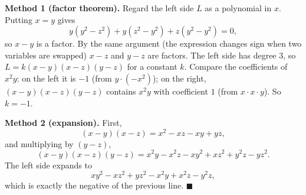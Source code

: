 \textbf{Method 1 (factor theorem).} Regard the left side $L$ as a polynomial in $x$. Putting $x=y$ gives
\[
y(y^2-z^2)+y(z^2-y^2)+z(y^2-y^2)=0 ,
\]
so $x-y$ is a factor. By the same argument (the expression changes sign when two variables are swapped) $x-z$ and $y-z$ are factors. The left side has degree $3$, so $L=k(x-y)(x-z)(y-z)$ for a constant $k$. Compare the coefficients of $x^2y$: on the left it is $-1$ (from $y\cdot(-x^2)$); on the right, $(x-y)(x-z)(y-z)$ contains $x^2y$ with coefficient $1$ (from $x\cdot x\cdot y$). So $k=-1$.

\textbf{Method 2 (expansion).} First,
\[
(x-y)(x-z)=x^2-xz-xy+yz,
\]
and multiplying by $(y-z)$,
\[
(x-y)(x-z)(y-z)=x^2y-x^2z-xy^2+xz^2+y^2z-yz^2 .
\]
The left side expands to
\[
xy^2-xz^2+yz^2-x^2y+x^2z-y^2z ,
\]
which is exactly the negative of the previous line. $\blacksquare$
